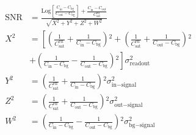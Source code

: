 \begin{equation}
\begin{split}
\text{SNR}&=\frac{\text{Log}\left[\frac{C_{\text{in}}-C_{\text{bg}}}{C_{\text{out}}-C_{\text{bg}}}\right]+\frac{C_{\text{in}}-C_{\text{out}}}{C_{\text{sat}}^{\text{eff}}}}{\sqrt{X^2+Y^2+Z^2+W^2}}\\
X^2&=\left[\left(\frac{1}{C_{\text{sat}}^{\text{eff}}}+\frac{1}{C_{\text{in}}-C_{\text{bg}}}\right){}^2+\left(\frac{1}{C_{\text{sat}}^{\text{eff}}}+\frac{1}{C_{\text{out}}-C_{\text{bg}}}\right){}^2\right.\\
&\left.+\left(\frac{1}{C_{\text{in}}-C_{\text{bg}}}-\frac{1}{C_{\text{out}}-C_{\text{bg}}}\right){}^2\right]\sigma_{\text{readout}}^2\\
Y^2&=\left(\frac{1}{C_{\text{sat}}^{\text{eff}}}+\frac{1}{C_{\text{in}}-C_{\text{bg}}}\right){}^2\sigma _{\text{in}-\text{signal}}^2\\
Z^2&=\left(\frac{1}{C_{\text{sat}}^{\text{eff}}}+\frac{1}{C_{\text{out}}-C_{\text{bg}}}\right){}^2\sigma_{\text{out}-\text{signal}}^2\\
W^2&=\left(\frac{1}{C_{\text{in}}-C_{\text{bg}}}-\frac{1}{C_{\text{out}}-C_{\text{bg}}}\right){}^2\sigma _{\text{bg}-\text{signal}}^2
\end{split}
\end{equation}


